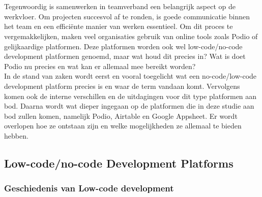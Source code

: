 \chapter{}%
\label{ch:stand-van-zaken}



Tegenwoordig is samenwerken in teamverband een belangrijk aspect op de werkvloer. Om projecten succesvol af te ronden, is goede communicatie binnen het team en een efficiënte manier van werken essentieel. Om dit proces te vergemakkelijken, maken veel organisaties gebruik van online tools zoals Podio of gelijkaardige platformen. Deze platformen worden ook wel low-code/no-code development platformen genoemd, maar wat houd dit precies in? Wat is doet Podio nu precies en wat kan er allemaal mee bereikt worden? \\
 
In de stand van zaken wordt eerst en vooral toegelicht wat een no-code/low-code development platform precies is en waar de term vandaan komt. Vervolgens komen ook de interne verschillen en de uitdagingen voor dit type platformen aan bod. Daarna wordt wat dieper ingegaan op de platformen die in deze studie aan bod zullen komen, namelijk Podio, Airtable en Google Appsheet. Er wordt overlopen hoe ze ontstaan zijn en welke mogelijkheden ze allemaal te bieden hebben. \\

\section{Low-code/no-code Development Platforms} 
\label{sec:low_code}

\subsection{Geschiedenis van Low-code development}
\label{subsec:geschiedenis_low_code}

